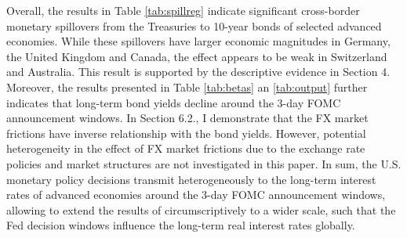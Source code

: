 Overall, the results in Table \ref{tab:spillreg} indicate significant cross-border monetary spillovers from the Treasuries to 10-year bonds of selected advanced economies. While these spillovers have larger economic magnitudes in Germany, the United Kingdom and Canada, the effect appears to be weak in Switzerland and Australia. This result is supported by the descriptive evidence in Section 4. Moreover, the results presented in Table \ref{tab:betas} an \ref{tab:output} further indicates that long-term bond yields decline around the 3-day FOMC announcement windows. In Section 6.2., I demonstrate that the FX market frictions have inverse relationship with the bond yields. However, potential heterogeneity in the effect of FX market frictions due to the exchange rate policies and market structures are not investigated in this paper. In sum, the U.S. monetary policy decisions transmit heterogeneously to the long-term interest rates of advanced economies around the 3-day FOMC announcement windows, allowing to extend the results of \citet{hillenbrand2022} circumscriptively to a wider scale, such that the Fed decision windows influence the long-term real interest rates globally.


